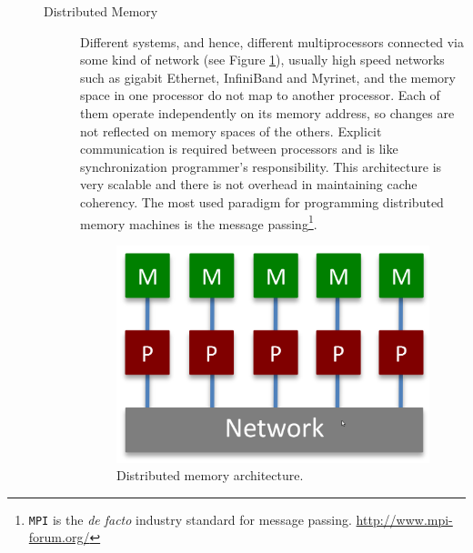 \begin{description}
\begin{description}
\begin{itemize}
	\end{itemize}
	

	\item [Distributed Memory] 	Different systems, and hence, different multiprocessors connected via some kind of network (see Figure \ref{fig:distribuiteMemory}), usually high speed networks such as gigabit Ethernet, InfiniBand and Myrinet, and the memory space in one processor do not map to another processor. Each of them operate independently on its memory address, so changes are not reflected on memory spaces of the others. Explicit communication is required between processors and is like synchronization	programmer's responsibility.
	This architecture  is very scalable and there is not  overhead in maintaining	cache coherency. 	
	The most used paradigm for programming distributed memory machines is the
	message passing\footnote{\texttt{MPI} is the \textit{de facto} industry standard for
	message passing. \url{http://www.mpi-forum.org/}}.
	\begin{figure}
		\centering
		\caption{Distributed memory architecture.}
		\label{fig:distribuiteMemory}
		\setlength{\fboxrule}{1pt}%
		\includegraphics[scale=0.25]{./images/parallel_programming/distribuitedMemory}
	\end{figure}
	

\end{description}
\end{description}
